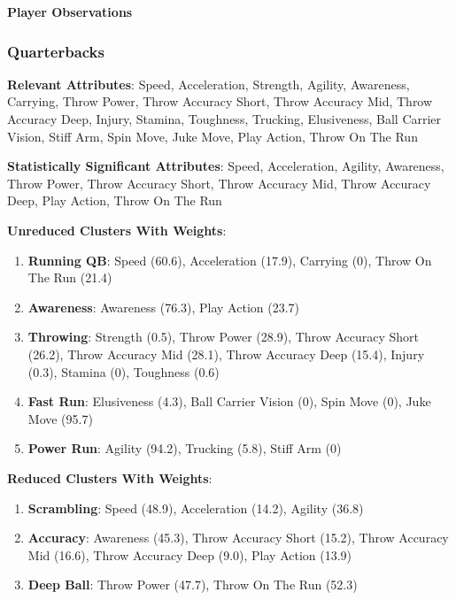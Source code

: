 \documentclass[11pt]{article}
\begin{document}
\textbf{Player Observations}

\subsubsection{Quarterbacks}

\textbf{Relevant Attributes}: Speed, Acceleration, Strength, Agility, Awareness, Carrying, Throw Power, Throw Accuracy Short, Throw Accuracy Mid, Throw Accuracy Deep, Injury, Stamina, Toughness, Trucking, Elusiveness, Ball Carrier Vision, Stiff Arm, Spin Move, Juke Move, Play Action, Throw On The Run

\textbf{Statistically Significant Attributes}: Speed, Acceleration, Agility, Awareness, Throw Power, Throw Accuracy Short, Throw Accuracy Mid, Throw Accuracy Deep, Play Action, Throw On The Run

\textbf{Unreduced Clusters With Weights}:

\begin{enumerate}
\item{\textbf{Running QB}}: Speed (60.6), Acceleration (17.9), Carrying (0), Throw On The Run (21.4)
\item{\textbf{Awareness}}: Awareness (76.3), Play Action (23.7)
\item{\textbf{Throwing}}: Strength (0.5), Throw Power (28.9), Throw Accuracy Short (26.2), Throw Accuracy Mid (28.1), Throw Accuracy Deep (15.4), Injury (0.3), Stamina (0), Toughness (0.6)
\item{\textbf{Fast Run}}: Elusiveness (4.3), Ball Carrier Vision (0), Spin Move (0), Juke Move (95.7)
\item{\textbf{Power Run}}: Agility (94.2), Trucking (5.8), Stiff Arm (0)
\end{enumerate}

\textbf{Reduced Clusters With Weights}:

\begin{enumerate}
\item{\textbf{Scrambling}}: Speed (48.9), Acceleration (14.2), Agility (36.8)
\item{\textbf{Accuracy}}: Awareness (45.3), Throw Accuracy Short (15.2), Throw Accuracy Mid (16.6), Throw Accuracy Deep (9.0), Play Action (13.9)
\item{\textbf{Deep Ball}}: Throw Power (47.7), Throw On The Run (52.3)
\end{enumerate}
\end{document}
